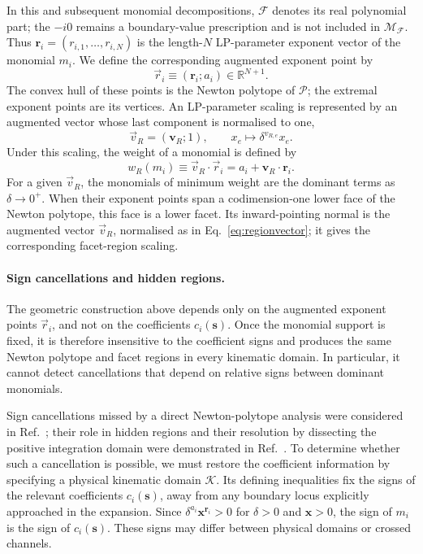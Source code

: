 \documentclass[a4paper,11pt]{article}
\newcommand{\x}{\boldsymbol{x}}
\newcommand{\s}{\boldsymbol{s}}
\newcommand{\K}{\mathcal K}
\begin{document}
In this and subsequent monomial decompositions, \(\mathcal F\) denotes its
real polynomial part; the \(-i0\) remains a boundary-value prescription and
is not included in \(\mathcal M_{\mathcal F}\).  Thus
\(\boldsymbol r_i=(r_{i,1},\ldots,r_{i,N})\) is the length-\(N\)
LP-parameter exponent vector of the monomial \(m_i\).  We define the
corresponding augmented exponent point by
\begin{equation}
 \vec r_i\equiv(\boldsymbol r_i;a_i)\in\mathbb R^{N+1}.
\end{equation}
The convex hull of these points is the Newton polytope of \(\mathcal P\); the
extremal exponent points are its vertices.  An LP-parameter
scaling is represented by an augmented vector whose last component is
normalised to one,
\begin{equation}
 \vec v_R=(\boldsymbol v_R;1),
 \qquad
 x_e\longmapsto \delta^{v_{R,e}}x_e.
\label{eq:regionvector}
\end{equation}
Under this scaling, the weight of a monomial is defined by
\begin{equation}
 w_R(m_i)\equiv \vec v_R\cdot\vec r_i
 =a_i+\boldsymbol v_R\cdot\boldsymbol r_i.
\label{eq:weight}
\end{equation}
For a given \(\vec v_R\), the monomials of minimum weight are the dominant
terms as \(\delta\to0^+\).  When their exponent points span a codimension-one
lower face of the Newton polytope, this face is a lower facet.  Its
inward-pointing normal is the augmented vector \(\vec v_R\), normalised as in
Eq.~\eqref{eq:regionvector}; it gives the corresponding facet-region scaling.

\paragraph{Sign cancellations and hidden regions.}

The geometric construction above depends only on the augmented exponent
points \(\vec r_i\), and not on the coefficients \(c_i(\s)\).  Once the
monomial support is fixed, it is therefore insensitive to the coefficient
signs and produces the same Newton polytope and facet regions in every
kinematic domain.  In particular, it cannot detect cancellations that depend
on relative signs between dominant monomials.

Sign cancellations missed by a direct Newton-polytope analysis were considered
in Ref.~\cite{Jantzen:2012mw}; their role in hidden regions and their resolution
by dissecting the positive integration domain were demonstrated in
Ref.~\cite{Gardi:2024axt}.  To determine whether such a cancellation is
possible, we must restore the coefficient information by specifying a physical
kinematic domain \(\K\).  Its defining inequalities fix the signs of the
relevant coefficients \(c_i(\s)\), away from any boundary locus explicitly
approached in the expansion.  Since
\(\delta^{a_i}\x^{\boldsymbol r_i}>0\) for \(\delta>0\) and \(\x>0\), the
sign of \(m_i\) is the sign of \(c_i(\s)\).  These signs may differ between
physical domains or crossed channels.
\end{document}

